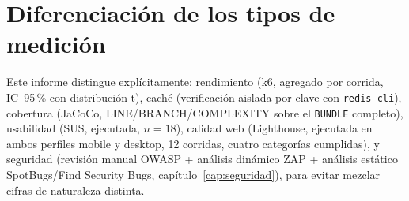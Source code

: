 \section{Diferenciaci\'on de los tipos de medici\'on}

Este informe distingue expl\'icitamente: rendimiento (k6, agregado por
corrida, IC~95\,\% con distribuci\'on t), cach\'e (verificaci\'on aislada
por clave con \texttt{redis-cli}), cobertura (JaCoCo, LINE/BRANCH/COMPLEXITY
sobre el \texttt{BUNDLE} completo), usabilidad (SUS, ejecutada, $n=18$),
calidad web (Lighthouse, ejecutada en ambos perfiles mobile y desktop, 12
corridas, cuatro categor\'ias cumplidas), y seguridad (revisi\'on manual OWASP +
an\'alisis din\'amico ZAP + an\'alisis est\'atico SpotBugs/Find Security
Bugs, cap\'itulo~\ref{cap:seguridad}), para evitar mezclar cifras de
naturaleza distinta.
